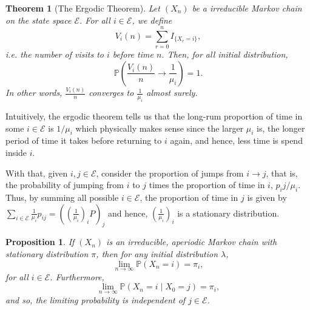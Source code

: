 \documentclass[
]{article}
\newtheorem{theorem}{Theorem}
\newtheorem{prop}{Proposition}[theorem]
\theoremstyle{definition}
\begin{document}
\begin{theorem}[The Ergodic Theorem]
  Let \((X_n)\) be a irreducible Markov chain on the state space \(\mathcal{E}\). 
  For all \(i \in \mathcal{E}\), we define 
  \[V_i(n) = \sum_{r = 0}^n I_{\{X_r = i\}},\]
  i.e. the number of visits to \(i\) before time \(n\). Then, for all initial 
  distribution, 
  \[\mathbb{P}\left(\frac{V_i(n)}{n} \to \frac{1}{\mu_i}\right) = 1.\]
  In other words, \(\frac{V_i(n)}{n}\) converges to \(\frac{1}{\mu_i}\) almost 
  surely.
\end{theorem}

Intuitively, the ergodic theorem tells us that the long-rum proportion
of time in some \(i \in \mathcal{E}\) is \(1 / \mu_i\) which physically
makes sense since the larger \(\mu_i\) is, the longer period of time it
takes before returning to \(i\) again, and hence, less time is spend
inside \(i\).

With that, given \(i, j \in \mathcal{E}\), consider the proportion of
jumps from \(i \to j\), that is, the probability of jumping from \(i\)
to \(j\) times the proportion of time in \(i\), \(p_ij / \mu_i\). Thus,
by summing all possible \(i \in \mathcal{E}\), the proportion of time in
\(j\) is given by
\(\sum_{i \in \mathcal{E}} \frac{1}{\mu_i} p_{ij} = ((\frac{1}{\mu_i})_i P)_j\)
and hence, \((\frac{1}{\mu_i})_i\) is a stationary distribution.

\begin{prop}
  If \((X_n)\) is an irreducible, aperiodic Markov chain with stationary distribution 
  \(\pi\), then for any initial distribution \(\lambda\), 
  \[\lim_{n \to \infty} \mathbb{P}(X_n = i) = \pi_i,\]
  for all \(i \in \mathcal{E}\). Furthermore, 
  \[\lim_{n \to \infty} \mathbb{P}(X_n = i \mid X_0 = j) = \pi_i,\]
  and so, the limiting probability is independent of \(j \in \mathcal{E}\).
\end{prop}
\end{document}
